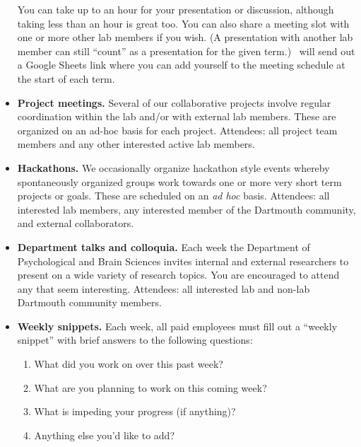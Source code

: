 \documentclass{tufte-book} %
\begin{document}
\begin{itemize}
  You can take up to an hour for your presentation or discussion,
  although taking less than an hour is great too.  You can also share
  a meeting slot with one or more other lab members if you wish.  (A
  presentation with another lab member can still ``count'' as a
  presentation for the given term.)  \director~will send out a Google Sheets
  link where you can add yourself to the meeting schedule at the start
  of each term.



\item \textbf{Project meetings.}  Several of our collaborative
  projects involve regular coordination within the lab and/or with external lab members.
  These are organized on an ad-hoc basis for each project.
  Attendees: all project team members and any other interested active
  lab members.

  \item \textbf{Hackathons.}  We occasionally organize hackathon
    style events whereby spontaneously organized groups work towards
    one or more very short term projects or goals.  These are
    scheduled on an \textit{ad hoc} basis.  Attendees: all interested
    lab members, any interested member of the Dartmouth community, and
    external collaborators.

\item \textbf{Department talks and colloquia.} Each week the
  Department of Psychological and Brain Sciences invites internal and
  external researchers to present on a wide variety of research
  topics.  You are encouraged to attend any that seem interesting.
  Attendees: all interested lab and non-lab Dartmouth community
  members.

    \item \textbf{Weekly snippets.} Each week, all
      paid employees must fill out a ``weekly snippet'' 
      with brief answers to the following questions:
      \begin{enumerate}
      \item What did you work on over this past week?
      \item What are you planning to work on this coming week?
      \item What is impeding your progress (if anything)?
      \item Anything else you'd like to add?
      \end{enumerate}


\end{itemize}
\end{document}
